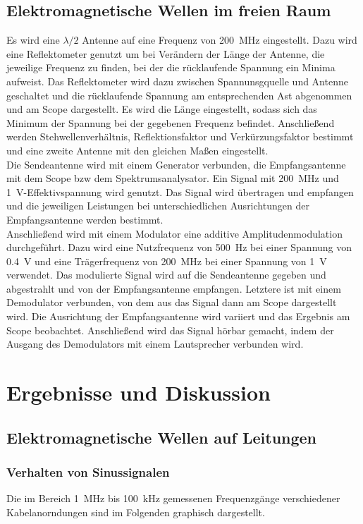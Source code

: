 \documentclass[a4paper,twoside,final]{article}
\begin{document}
\subsection{Elektromagnetische Wellen im freien Raum}
Es wird eine $\lambda/2$ Antenne auf eine Frequenz von \SI{200}{\mega\hertz} eingestellt. Dazu wird eine Reflektometer genutzt um bei Verändern der Länge der Antenne, die jeweilige Frequenz zu finden, bei der die rücklaufende Spannung ein Minima aufweist. Das Reflektometer wird dazu zwischen Spannunsgquelle und Antenne geschaltet und die rücklaufende Spannung am entsprechenden Ast abgenommen und am Scope dargestellt. Es wird die Länge eingestellt, sodass sich das Minimum der Spannung bei der gegebenen Frequenz befindet. Anschließend werden Stehwellenverhältnis, Reflektionsfaktor und Verkürzungsfaktor bestimmt und eine zweite Antenne mit den gleichen Maßen eingestellt. \\
Die Sendeantenne wird mit einem Generator verbunden, die Empfangsantenne mit dem Scope bzw dem Spektrumsanalysator. Ein Signal mit \SI{200}{\mega\hertz} und \SI{1}{\volt}-Effektivspannung wird genutzt. Das Signal wird übertragen und empfangen und die jeweiligen Leistungen bei unterschiedlichen Ausrichtungen der Empfangsantenne werden bestimmt. \\
Anschließend wird mit einem Modulator eine additive Amplitudenmodulation durchgeführt. Dazu wird eine Nutzfrequenz von \SI{500}{\hertz} bei einer Spannung von \SI{0,4}{\volt} und eine Trägerfrequenz von \SI{200}{\mega\hertz} bei einer Spannung von \SI{1}{\volt} verwendet. Das modulierte Signal wird auf die Sendeantenne gegeben und abgestrahlt und von der Empfangsantenne empfangen. Letztere ist mit einem Demodulator verbunden, von dem aus das Signal dann am Scope dargestellt wird. Die Ausrichtung der Empfangsantenne wird variiert und das Ergebnis am Scope beobachtet. Anschließend wird das Signal hörbar gemacht, indem der Ausgang des Demodulators mit einem Lautsprecher verbunden wird.
\newpage
\section{Ergebnisse und Diskussion}
\subsection{Elektromagnetische Wellen auf Leitungen}
\subsubsection{Verhalten von Sinussignalen}
Die im Bereich \SI{1}{\mega\hertz} bis \SI{100}{\kilo\hertz} gemessenen Frequenzgänge verschiedener Kabelanorndungen sind im Folgenden graphisch dargestellt.
\end{document}
